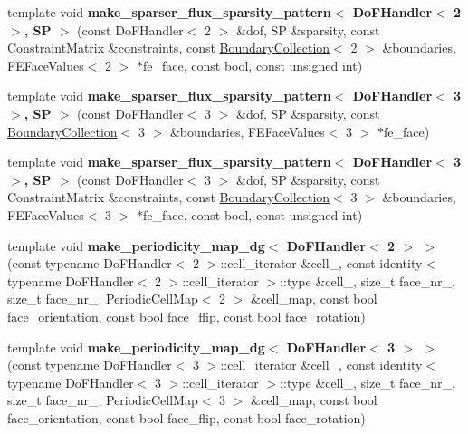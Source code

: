 \begin{DoxyCompactItemize}
\item 
\hypertarget{namespacenatrium_1_1DealIIExtensions_a9f6065aca54041aa9bd6ca3733478988}{
template void {\bfseries make\_\-sparser\_\-flux\_\-sparsity\_\-pattern$<$ DoFHandler$<$ 2 $>$, SP $>$} (const DoFHandler$<$ 2 $>$ \&dof, SP \&sparsity, const ConstraintMatrix \&constraints, const \hyperlink{classnatrium_1_1BoundaryCollection}{BoundaryCollection}$<$ 2 $>$ \&boundaries, FEFaceValues$<$ 2 $>$ $\ast$fe\_\-face, const bool, const unsigned int)}
\label{namespacenatrium_1_1DealIIExtensions_a9f6065aca54041aa9bd6ca3733478988}

\item 
\hypertarget{namespacenatrium_1_1DealIIExtensions_a33884e02520bb06cf29f3be01a2d7b42}{
template void {\bfseries make\_\-sparser\_\-flux\_\-sparsity\_\-pattern$<$ DoFHandler$<$ 3 $>$, SP $>$} (const DoFHandler$<$ 3 $>$ \&dof, SP \&sparsity, const \hyperlink{classnatrium_1_1BoundaryCollection}{BoundaryCollection}$<$ 3 $>$ \&boundaries, FEFaceValues$<$ 3 $>$ $\ast$fe\_\-face)}
\label{namespacenatrium_1_1DealIIExtensions_a33884e02520bb06cf29f3be01a2d7b42}

\item 
\hypertarget{namespacenatrium_1_1DealIIExtensions_a6bfd0edfcc602aa68f3e5e627a5f1e8b}{
template void {\bfseries make\_\-sparser\_\-flux\_\-sparsity\_\-pattern$<$ DoFHandler$<$ 3 $>$, SP $>$} (const DoFHandler$<$ 3 $>$ \&dof, SP \&sparsity, const ConstraintMatrix \&constraints, const \hyperlink{classnatrium_1_1BoundaryCollection}{BoundaryCollection}$<$ 3 $>$ \&boundaries, FEFaceValues$<$ 3 $>$ $\ast$fe\_\-face, const bool, const unsigned int)}
\label{namespacenatrium_1_1DealIIExtensions_a6bfd0edfcc602aa68f3e5e627a5f1e8b}

\item 
\hypertarget{namespacenatrium_1_1DealIIExtensions_aec93b076a99e59c28b7921e26d81b450}{
template void {\bfseries make\_\-periodicity\_\-map\_\-dg$<$ DoFHandler$<$ 2 $>$ $>$} (const typename DoFHandler$<$ 2 $>$::cell\_\-iterator \&cell\_, const identity$<$ typename DoFHandler$<$ 2 $>$::cell\_\-iterator $>$::type \&cell\_, size\_\-t face\_\-nr\_, size\_\-t face\_\-nr\_, PeriodicCellMap$<$ 2 $>$ \&cell\_\-map, const bool face\_\-orientation, const bool face\_\-flip, const bool face\_\-rotation)}
\label{namespacenatrium_1_1DealIIExtensions_aec93b076a99e59c28b7921e26d81b450}

\item 
\hypertarget{namespacenatrium_1_1DealIIExtensions_aff90e32d1a427e62cb287350abe90ba0}{
template void {\bfseries make\_\-periodicity\_\-map\_\-dg$<$ DoFHandler$<$ 3 $>$ $>$} (const typename DoFHandler$<$ 3 $>$::cell\_\-iterator \&cell\_, const identity$<$ typename DoFHandler$<$ 3 $>$::cell\_\-iterator $>$::type \&cell\_, size\_\-t face\_\-nr\_, size\_\-t face\_\-nr\_, PeriodicCellMap$<$ 3 $>$ \&cell\_\-map, const bool face\_\-orientation, const bool face\_\-flip, const bool face\_\-rotation)}
\label{namespacenatrium_1_1DealIIExtensions_aff90e32d1a427e62cb287350abe90ba0}


\end{DoxyCompactItemize}
